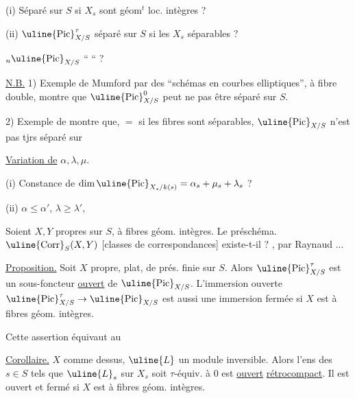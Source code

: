 (i) Séparé sur $S$ si $X_s$ sont géom$^t$ loc. intègres ?

(ii) $\uline{\mathrm{Pic}}^\tau_{X/S}$ séparé sur $S$ si les $X_s$ séparables ?

${}_n\uline{\mathrm{Pic}}_{X/S}$ \qquad `` \qquad `` \qquad ?

\uline{N.B.} 1) Exemple de Mumford par des ``schémas en courbes elliptiques'', à fibre double, montre que $\uline{\mathrm{Pic}}^0_{X/S}$ peut ne pas être séparé sur $S$.

2) Exemple de
montre que, $=$ si les fibres sont séparables, $\uline{\mathrm{Pic}}_{X/S}$ n'est pas tjrs  séparé sur 

\uline{Variation de} $\alpha,\lambda,\mu$.

(i) Constance de $\dim\uline{\mathrm{Pic}}_{X_s/k(s)}=\alpha_s+\mu_s+\lambda_s$ ?

(ii) $\alpha\leq\alpha'$, $\lambda\geq\lambda'$, 


Soient $X,Y$ propres sur $S$, à fibres géom. intègres. Le préschéma. $\uline{\mathrm{Corr}}_S(X,Y)$ [classes de correspondances] existe-t-il ? , par Raynaud ...

\uline{Proposition.} Soit $X$ propre, plat, de prés. finie sur $S$. Alors $\uline{\mathrm{Pic}}^\tau_{X/S}$ est un sous-foncteur \uline{ouvert}  de $\uline{\mathrm{Pic}}_{X/S}$. L'immersion ouverte $\uline{\mathrm{Pic}}^\tau_{X/S}\to\uline{\mathrm{Pic}}_{X/S}$ est aussi une immersion fermée si $X$ est  à fibres géom. intègres.

Cette assertion équivaut au

\uline{Corollaire.} $X$ comme dessus, $\uline{L}$ un module inversible. Alors l'ens  des $s\in S$ tels que $\uline{L}_s$ sur $X_s$ soit  $\tau$-équiv. à $0$ est \uline{ouvert} \uline{rétrocompact}. Il est ouvert et fermé si $X$ est  à fibres géom. intègres.

